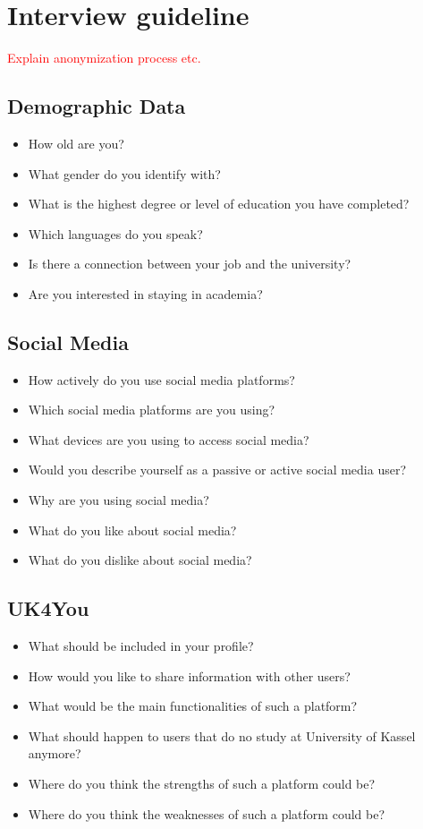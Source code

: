 \section{Interview guideline} \label{sec:guideline}
\textcolor{red}{Explain anonymization process etc. }

\subsection{Demographic Data}
\begin{itemize}
    \item How old are you?
    \item What gender do you identify with?
    \item What is the highest degree or level of education you have completed?
    \item Which languages do you speak?
    \item Is there a connection between your job and the university?
    \item Are you interested in staying in academia?
\end{itemize}

\subsection{Social Media}
\begin{itemize}
    \item How actively do you use social media platforms?
    \item Which social media platforms are you using?
    \item What devices are you using to access social media?
    \item Would you describe yourself as a passive or active social media user?
    \item Why are you using social media?
    \item What do you like about social media?
    \item What do you dislike about social media?
\end{itemize}

\subsection{UK4You}
\begin{itemize}
    \item What should be included in your profile?
    \item How would you like to share information with other users?
    \item What would be the main functionalities of such a platform?
    \item What should happen to users that do no study at University of Kassel anymore?
    \item Where do you think the strengths of such a platform could be?
    \item Where do you think the weaknesses of such a platform could be?
\end{itemize}